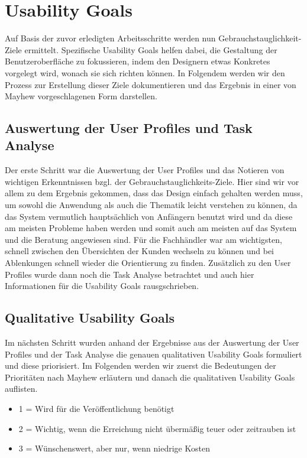 \chapter{Usability Goals}

Auf Basis der zuvor erledigten Arbeitsschritte werden nun Gebrauchstauglichkeit-Ziele ermittelt. Spezifische Usability Goals helfen dabei, die Gestaltung der Benutzeroberfläche zu fokussieren, indem den Designern etwas Konkretes vorgelegt wird, wonach sie sich richten können. In Folgendem werden wir den Prozess zur Erstellung dieser Ziele dokumentieren und das Ergebnis in einer von Mayhew vorgeschlagenen Form darstellen.

\section{Auswertung der User Profiles und Task Analyse}

Der erste Schritt war die Auswertung der User Profiles und das Notieren von wichtigen Erkenntnissen bzgl. der Gebrauchstauglichkeits-Ziele. Hier sind wir vor allem zu dem Ergebnis gekommen, dass das Design einfach gehalten werden muss, um sowohl die Anwendung als auch die Thematik leicht verstehen zu können, da das System vermutlich hauptsächlich von Anfängern benutzt wird und da diese am meisten Probleme haben werden und somit auch am meisten auf das System und die Beratung angewiesen sind. Für die Fachhändler war am wichtigsten, schnell zwischen den Übersichten der Kunden wechseln zu können und bei Ablenkungen schnell wieder die Orientierung zu finden. Zusätzlich zu den User Profiles wurde dann noch die Task Analyse betrachtet und auch hier Informationen für die Usability Goals rausgschrieben.

\section{Qualitative Usability Goals}

Im nächsten Schritt wurden anhand der Ergebnisse aus der Auswertung der User Profiles und der Task Analyse die genauen qualitativen Usability Goals formuliert und diese priorisiert. Im Folgenden werden wir zuerst die Bedeutungen der Prioritäten nach Mayhew erläutern und danach die qualitativen Usability Goals auflisten.

\begin{itemize}
  \item 1 = Wird für die Veröffentlichung benötigt
  \item 2 = Wichtig, wenn die Erreichung nicht übermäßig teuer oder zeitrauben ist
  \item 3 = Wünschenswert, aber nur, wenn niedrige Kosten
\end{itemize}	

